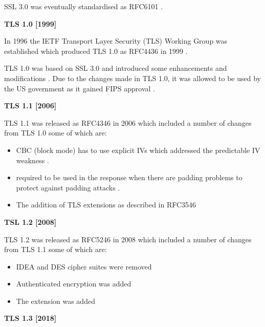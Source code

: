 \documentclass{mscreport}
\begin{document}
\vspace{0.3cm}\noindent
SSL 3.0 was eventually standardised as RFC6101 \cite{Freier2011-pt}.

\vspace{0.7cm} \noindent
\textbf{TLS 1.0 [1999]}

\noindent
In 1996 the IETF Transport Layer Security (TLS) Working Group was established \cite{Oppliger2016-ig,Farrell2010-kv} which produced TLS 1.0 as RFC4436 in 1999 \cite{Dierks1999-fn}.

\vspace{0.3cm} \noindent
TLS 1.0 was based on SSL 3.0 and introduced some enhancements and modifications \cite{Rescorla2001-gg}. Due to the changes made in TLS 1.0, it was allowed to be used by the US government as it gained FIPS approval \cite{Ristic2017-aj}.

\vspace{0.7cm} \noindent
\textbf{TLS 1.1 [2006]}

\noindent
TLS 1.1 was released as RFC4346 in 2006 \cite{Dierks2006-wu} which included a number of changes from TLS 1.0 some of which are:
\begin{itemize}
  \setlength\itemsep{0.1em}
  \item CBC (block mode) has to use explicit IVs which addressed the predictable IV weakness \cite{Ristic2017-aj}.
  \item \texttt{} required to be used in the response when there are padding problems to protect against padding attacks \cite{Ristic2017-aj}.
  \item The addition of TLS extensions \cite{Ristic2017-aj} as described in RFC3546 \cite{Blake-Wilson2003-qv}
\end{itemize}

\vspace{0.7cm} \noindent
\textbf{TSL 1.2 [2008]}

\noindent
TLS 1.2 was released as RFC5246 in 2008 \cite{Dierks2008-uy} which included a number of changes from TLS 1.1 some of which are:
\begin{itemize}
  \setlength\itemsep{0.1em}
  \item IDEA and DES cipher suites were removed
  \item Authenticated encryption was added
  \item The extension \texttt{} was added
\end{itemize}

\vspace{0.7cm} \noindent
\textbf{TLS 1.3 [2018]}
\end{document}
